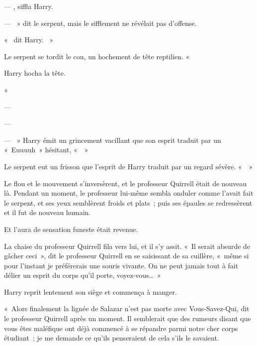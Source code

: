--- , siffla Harry. 

--- ~» dit le serpent, mais le sifflement ne révélait pas d'offense.

«~ dit Harry. ~»

Le serpent se tordit le cou, un hochement de tête reptilien. «~

Harry hocha la tête.

«~

--- 

--- 

--- ~» Harry émit un grincement vacillant que son esprit traduit par un «~Euuuuh~» hésitant, «~~»

Le serpent eut un frisson que l'esprit de Harry traduit par un regard sévère. «~~»

Le flou et le mouvement s'inversèrent, et le professeur Quirrell était de nouveau là. Pendant un moment, le professeur lui-même sembla onduler comme l'avait fait le serpent, et ses yeux semblèrent froids et plats~; puis ses épaules se redressèrent et il fut de nouveau humain.

Et l'aura de sensation funeste était revenue.

La chaise du professeur Quirrell fila vers lui, et il s'y assit. «~Il serait absurde de gâcher ceci~», dit le professeur Quirrell en se saisissant de sa cuillère, «~même si pour l'instant je préférerais une souris vivante. On ne peut jamais tout à fait délier un esprit du corps qu'il porte, voyez-vous…~»

Harry reprit lentement son siège et commença à manger.

\later

«~Alors finalement la lignée de Salazar n'est pas morte avec Vous-Savez-Qui, dit le professeur Quirrell après un moment. Il semblerait que des rumeurs disant que vous êtes maléfique ont déjà commencé à se répandre parmi notre cher corps étudiant~; je me demande ce qu'ils penseraient de cela s'ils le savaient.

